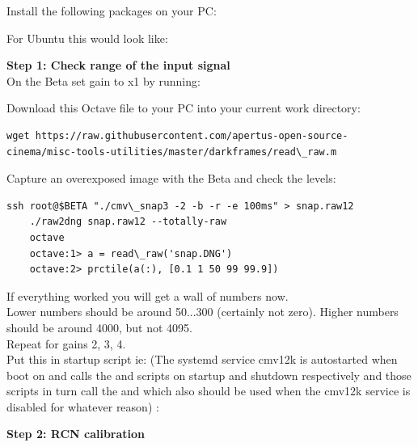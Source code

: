 Install the following packages on your PC: 
	
	
For Ubuntu this would look like: 
	
	
\textbf{Step 1: Check range of the input signal}\\
	
On the Beta set gain to x1 by running: 
	
	
Download this Octave file to your PC into your current work directory: 
	
\begin{lstlisting}[breaklines=true, breakatwhitespace=true]
wget https://raw.githubusercontent.com/apertus-open-source-cinema/misc-tools-utilities/master/darkframes/read\_raw.m
\end{lstlisting}
	
Capture an overexposed image with the Beta and check the levels:\\ 
	
\begin{lstlisting}[breaklines=true, breakatwhitespace=true]
	ssh root@$BETA "./cmv\_snap3 -2 -b -r -e 100ms" > snap.raw12
	./raw2dng snap.raw12 --totally-raw
	octave
	octave:1> a = read\_raw('snap.DNG')
	octave:2> prctile(a(:), [0.1 1 50 99 99.9])
\end{lstlisting}

If everything worked you will get a wall of numbers now.\\ 
	
Lower numbers should be around 50...300 (certainly not zero). Higher numbers should be around 4000, but not 4095.\\
	
Repeat for gains 2, 3, 4.\\
	
Put this in startup script ie:  (The systemd service cmv12k is autostarted when boot on and calls the  and  scripts on startup and shutdown respectively and those scripts in turn call the  and  which also should be used when the cmv12k service is disabled for whatever reason) : 
	
	
\textbf{Step 2: RCN calibration}\\
	
